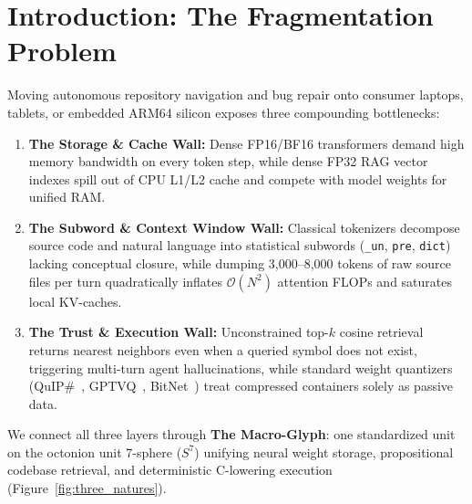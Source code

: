 \documentclass[10pt,twocolumn,letterpaper]{article}
\begin{document}
\section{Introduction: The Fragmentation Problem}

Moving autonomous repository navigation and bug repair onto consumer laptops, tablets, or embedded ARM64 silicon exposes three compounding bottlenecks:

\begin{enumerate}
  \item \textbf{The Storage \& Cache Wall:} Dense FP16/BF16 transformers demand high memory bandwidth on every token step, while dense FP32 RAG vector indexes spill out of CPU L1/L2 cache and compete with model weights for unified RAM.
  \item \textbf{The Subword \& Context Window Wall:} Classical tokenizers decompose source code and natural language into statistical subwords (\texttt{\_un}, \texttt{pre}, \texttt{dict}) lacking conceptual closure, while dumping 3,000--8,000 tokens of raw source files per turn quadratically inflates $\mathcal{O}(N^2)$ attention FLOPs and saturates local KV-caches.
  \item \textbf{The Trust \& Execution Wall:} Unconstrained top-$k$ cosine retrieval returns nearest neighbors even when a queried symbol does not exist, triggering multi-turn agent hallucinations, while standard weight quantizers (QuIP\#~\cite{tseng2024quip}, GPTVQ~\cite{vanbaalen2024gptvq}, BitNet~\cite{ma2024bitnet}) treat compressed containers solely as passive data.
\end{enumerate}

We connect all three layers through \textbf{The Macro-Glyph}: one standardized unit on the octonion unit 7-sphere ($S^7$) unifying neural weight storage, propositional codebase retrieval, and deterministic C-lowering execution (Figure~\ref{fig:three_natures}).
\end{document}
